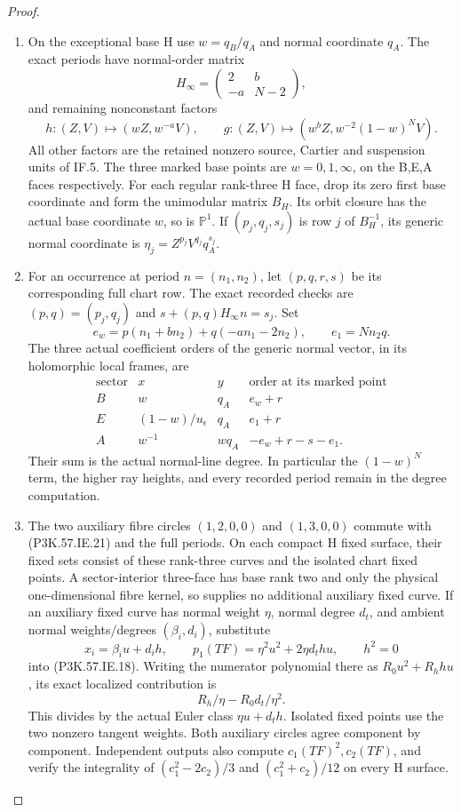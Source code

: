 \begin{proof}
\begin{enumerate}[label=\arabic*.]
\item On the exceptional base H use \(w=q_B/q_A\) and
normal coordinate \(q_A\). The exact periods have
normal-order matrix
\[
 H_\infty=\begin{pmatrix}2&b\\-a&N-2\end{pmatrix},
\]
and remaining nonconstant factors
\[
 h:(Z,V)\mapsto(wZ,w^{-a}V),\qquad
 g:(Z,V)\mapsto(w^bZ,w^{-2}(1-w)^N V).                 \tag{P3K.57.IE.21}
\]
All other factors are the retained nonzero source,
Cartier and suspension units of IF.5. The three
marked base points are \(w=0,1,\infty\), on the
B,E,A faces respectively. For each regular rank-three
H face, drop its zero first base coordinate and
form the unimodular matrix \(B_H\). Its orbit
closure has the actual base coordinate \(w\), so
is \(\mathbb P^1\). If
\((p_j,q_j,s_j)\) is row \(j\) of \(B_H^{-1}\),
its generic normal coordinate is
\(\eta_j=Z^{p_j}V^{q_j}q_A^{s_j}\).

\item For an occurrence at period \(n=(n_1,n_2)\), let
\((p,q,r,s)\) be its corresponding full chart row.
The exact recorded checks are
\((p,q)=(p_j,q_j)\) and
\(s+(p,q)H_\infty n=s_j\). Set
\[
 e_w=p(n_1+bn_2)+q(-an_1-2n_2),\qquad e_1=Nn_2q.
\]
The three actual coefficient orders of the generic
normal vector, in its holomorphic local frames, are
\[
 \begin{array}{c|cc|c}
  \text{sector}&x&y&\text{order at its marked point}\\ \hline
  B&w&q_A&e_w+r\\
  E&(1-w)/u_\epsilon&q_A&e_1+r\\
  A&w^{-1}&wq_A&-e_w+r-s-e_1.
 \end{array}                                             \tag{P3K.57.IE.22}
\]
Their sum is the actual normal-line degree. In
particular the \((1-w)^N\) term, the higher ray
heights, and every recorded period remain in the
degree computation.

\item The two auxiliary fibre circles \((1,2,0,0)\) and
\((1,3,0,0)\) commute with (P3K.57.IE.21) and the full
periods. On each compact H fixed surface, their
fixed sets consist of these rank-three curves and
the isolated chart fixed points. A sector-interior
three-face has base rank two and only the physical
one-dimensional fibre kernel, so supplies no
additional auxiliary fixed curve. If an auxiliary
fixed curve has normal weight \(\eta\), normal
degree \(d_t\), and ambient normal weights/degrees
\((\beta_i,d_i)\), substitute
\[
 x_i=\beta_i u+d_i h,\qquad
 p_1(TF)=\eta^2u^2+2\eta d_t hu,\qquad h^2=0
\]
into (P3K.57.IE.18). Writing the numerator polynomial
there as \(R_0u^2+R_hhu\), its exact localized
contribution is
\[
                         R_h/\eta-R_0d_t/\eta^2.         \tag{P3K.57.IE.23}
\]
This divides by the actual Euler class
\(\eta u+d_t h\). Isolated fixed points use the
two nonzero tangent weights. Both auxiliary circles
agree component by component. Independent outputs
also compute \(c_1(TF)^2,c_2(TF)\), and verify the
integrality of \((c_1^2-2c_2)/3\) and
\((c_1^2+c_2)/12\) on every H surface.


\end{enumerate}
\end{proof}
